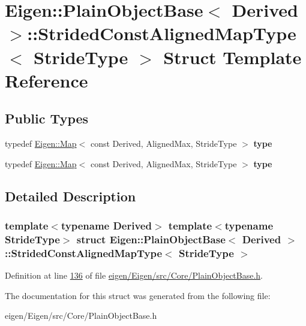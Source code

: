 \hypertarget{struct_eigen_1_1_plain_object_base_1_1_strided_const_aligned_map_type}{}\section{Eigen\+:\+:Plain\+Object\+Base$<$ Derived $>$\+:\+:Strided\+Const\+Aligned\+Map\+Type$<$ Stride\+Type $>$ Struct Template Reference}
\label{struct_eigen_1_1_plain_object_base_1_1_strided_const_aligned_map_type}
\subsection*{Public Types}
\begin{DoxyCompactItemize}
\item 
\mbox{\label{struct_eigen_1_1_plain_object_base_1_1_strided_const_aligned_map_type_aab9f66776da406ad79a73a9ab9793d63}} 
typedef \hyperlink{group___core___module_class_eigen_1_1_map}{Eigen\+::\+Map}$<$ const Derived, Aligned\+Max, Stride\+Type $>$ {\bfseries type}
\item 
\mbox{\label{struct_eigen_1_1_plain_object_base_1_1_strided_const_aligned_map_type_aab9f66776da406ad79a73a9ab9793d63}} 
typedef \hyperlink{group___core___module_class_eigen_1_1_map}{Eigen\+::\+Map}$<$ const Derived, Aligned\+Max, Stride\+Type $>$ {\bfseries type}
\end{DoxyCompactItemize}


\subsection{Detailed Description}
\subsubsection*{template$<$typename Derived$>$\newline
template$<$typename Stride\+Type$>$\newline
struct Eigen\+::\+Plain\+Object\+Base$<$ Derived $>$\+::\+Strided\+Const\+Aligned\+Map\+Type$<$ Stride\+Type $>$}



Definition at line \hyperlink{eigen_2_eigen_2src_2_core_2_plain_object_base_8h_source_l00136}{136} of file \hyperlink{eigen_2_eigen_2src_2_core_2_plain_object_base_8h_source}{eigen/\+Eigen/src/\+Core/\+Plain\+Object\+Base.\+h}.



The documentation for this struct was generated from the following file\+:\begin{DoxyCompactItemize}
\item 
eigen/\+Eigen/src/\+Core/\+Plain\+Object\+Base.\+h\end{DoxyCompactItemize}
